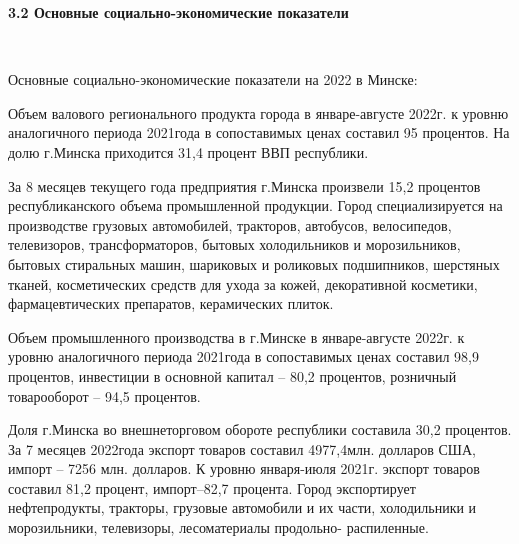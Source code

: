 \documentclass[14pt,a4paper]{article}
\begin{document}
    \begin{center}
        \textbf{3.2 Основные социально-экономические показатели}
    \end{center}
    \\
    \par
    Основные социально-экономические показатели на 2022 в Минске:
    \par
    Объем валового регионального продукта города в январе-августе 2022г. к уровню аналогичного периода 2021года в сопоставимых ценах составил 95 процентов.
    На долю г.Минска приходится 31,4 процент ВВП республики.
    \par
    За 8 месяцев текущего года предприятия г.Минска произвели 15,2 процентов республиканского объема промышленной продукции.
    Город специализируется на производстве грузовых автомобилей, тракторов, автобусов, велосипедов, телевизоров, трансформаторов, бытовых холодильников и морозильников, бытовых стиральных машин, шариковых и роликовых подшипников, шерстяных тканей, косметических средств для ухода за кожей, декоративной косметики, фармацевтических препаратов, керамических плиток.
    \par
    Объем промышленного производства в г.Минске в январе-августе 2022г. к уровню аналогичного периода 2021года в сопоставимых ценах составил 98,9 процентов, инвестиции в основной капитал – 80,2 процентов, розничный товарооборот – 94,5 процентов.
    \par
    Доля г.Минска во внешнеторговом обороте республики составила 30,2 процентов.
    За 7 месяцев 2022года экспорт товаров составил 4977,4млн. долларов США, импорт – 7256 млн. долларов. К уровню января-июля 2021г. экспорт товаров составил 81,2 процент, импорт–82,7 процента.
    Город экспортирует нефтепродукты, тракторы, грузовые автомобили и их части, холодильники и морозильники, телевизоры, лесоматериалы продольно- распиленные.
\end{document}
